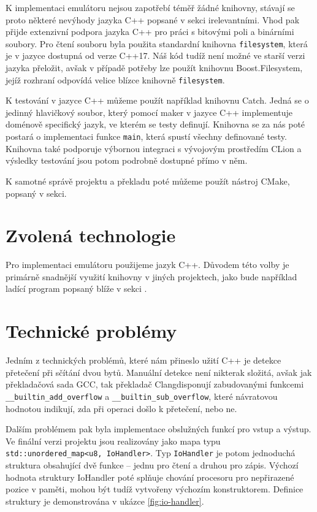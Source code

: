 K implementaci emulátoru nejsou zapotřebí téměř žádné knihovny, stávají se proto některé nevýhody jazyka C++ popsané v sekci  irelevantními. Vhod pak přijde extenzivní podpora jazyka C++ pro práci s bitovými poli a binárními soubory. Pro čtení souboru byla použita standardní knihovna \texttt{filesystem}, která je v jazyce dostupná od verze C++17. Náš kód tudíž není možné ve starší verzi jazyka přeložit, avšak v případě potřeby lze použít knihovnu Boost.Filesystem, jejíž rozhraní odpovídá velice blízce knihovně \texttt{filesystem}.

K testování v jazyce C++ můžeme použít například knihovnu Catch\todocite. Jedná se o jedinný hlavičkový soubor, který pomocí maker v jazyce C++ implementuje doménově specifický jazyk, ve kterém se testy definují. Knihovna se za nás poté postará o implementaci funkce \texttt{main}, která spustí všechny definované testy. Knihovna také podporuje výbornou integraci s vývojovým prostředím CLion a výsledky testování jsou potom podrobně dostupné přímo v něm.


K samotné správě projektu a překladu poté můžeme použít nástroj CMake, popsaný v sekci.

\section{Zvolená technologie}

Pro implementaci emulátoru použijeme jazyk C++. Důvodem této volby je primárně snadnější využití knihovny v jiných projektech, jako bude například ladící program popsaný blíže v sekci .

\section{Technické problémy}

Jedním z technických problémů, které nám přineslo užití C++ je detekce přetečení při sčítání dvou bytů. Manuální detekce není nikterak složitá, avšak jak překladačová sada GCC\todocite, tak překladač Clang\todocite disponují zabudovanými funkcemi \texttt{\_\_builtin\_add\_overflow} a \texttt{\_\_builtin\_sub\_overflow}, které návratovou hodnotou indikují, zda při operaci došlo k přetečení, nebo ne.

Dalším problémem pak byla implementace obslužných funkcí pro vstup a výstup. Ve finální verzi projektu jsou realizovány jako mapa typu \texttt{std::unordered_map<u8, IoHandler>}. Typ \texttt{IoHandler} je potom jednoduchá struktura obsahující dvě funkce -- jednu pro čtení a druhou pro zápis. Výchozí hodnota struktury IoHandler poté splňuje chování procesoru pro nepřirazené pozice v paměti, mohou být tudíž vytvořeny výchozím konstruktorem. Definice struktury je demonstrována v ukázce \ref{fig:io-handler}.

